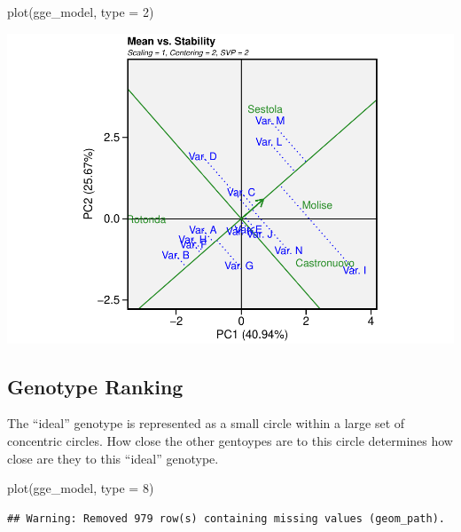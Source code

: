 \documentclass[
]{book}
\newenvironment{Shaded}{\begin{snugshade}}{\end{snugshade}}
\newcommand{\AttributeTok}[1]{\textcolor[rgb]{0.77,0.63,0.00}{#1}}
\newcommand{\DecValTok}[1]{\textcolor[rgb]{0.00,0.00,0.81}{#1}}
\newcommand{\FunctionTok}[1]{\textcolor[rgb]{0.00,0.00,0.00}{#1}}
\newcommand{\NormalTok}[1]{#1}
\begin{document}
\begin{Shaded}
\begin{Highlighting}[]
\FunctionTok{plot}\NormalTok{(gge\_model, }\AttributeTok{type =} \DecValTok{2}\NormalTok{)}
\end{Highlighting}
\end{Shaded}

\includegraphics{PPB-Toolkit-for-R-and-R-Studio_files/figure-latex/unnamed-chunk-128-1.pdf}

\hypertarget{genotype-ranking}{%
\subsection{Genotype Ranking}\label{genotype-ranking}}

The ``ideal'' genotype is represented as a small circle within a large set of concentric circles. How close the other gentoypes are to this circle determines how close are they to this ``ideal'' genotype.

\begin{Shaded}
\begin{Highlighting}[]
\FunctionTok{plot}\NormalTok{(gge\_model, }\AttributeTok{type =} \DecValTok{8}\NormalTok{)}
\end{Highlighting}
\end{Shaded}

\begin{verbatim}
## Warning: Removed 979 row(s) containing missing values (geom_path).
\end{verbatim}
\end{document}

